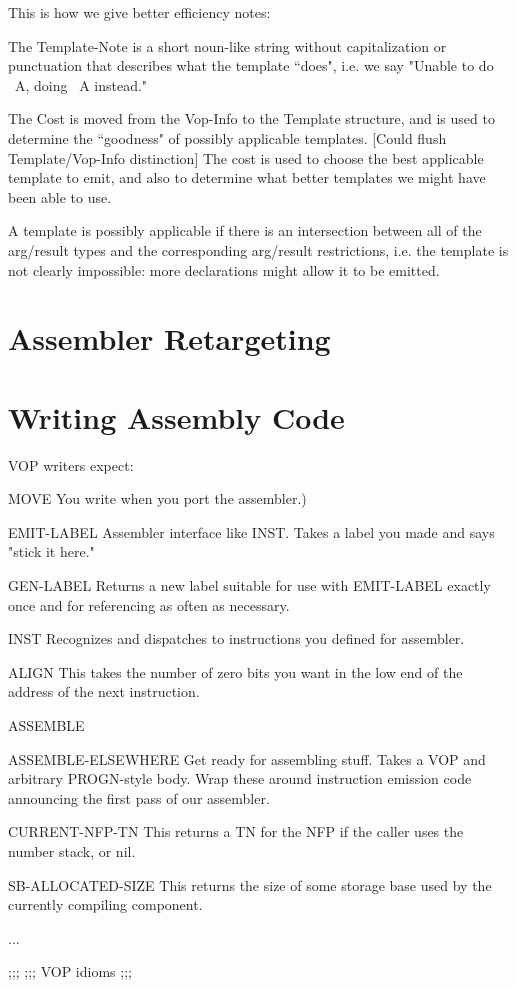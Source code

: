 This is how we give better efficiency notes:

The Template-Note is a short noun-like string without capitalization or
punctuation that describes what the template ``does", i.e. we say
"Unable to do ~A, doing ~A instead."

The Cost is moved from the Vop-Info to the Template structure, and is used to
determine the ``goodness" of possibly applicable templates.  [Could flush
Template/Vop-Info distinction]  The cost is used to choose the best applicable
template to emit, and also to determine what better templates we might have
been able to use.

A template is possibly applicable if there is an intersection between all of
the arg/result types and the corresponding arg/result restrictions, i.e. the
template is not clearly impossible: more declarations might allow it to be
emitted.


\chapter{Assembler Retargeting}


\chapter{Writing Assembly Code}

VOP writers expect:
\begin{Lentry}
\item[MOVE]
      You write when you port the assembler.)
\item[EMIT-LABEL]
      Assembler interface like INST.  Takes a label you made and says "stick it
      here."
   \item[GEN-LABEL]
      Returns a new label suitable for use with EMIT-LABEL exactly once and
      for referencing as often as necessary.
   \item[INST]
      Recognizes and dispatches to instructions you defined for assembler.
   \item[ALIGN]
      This takes the number of zero bits you want in the low end of the address
      of the next instruction.
   \item[ASSEMBLE]
   \item[ASSEMBLE-ELSEWHERE]
      Get ready for assembling stuff.  Takes a VOP and arbitrary PROGN-style
      body.  Wrap these around instruction emission code announcing the first
      pass of our assembler.
   \item[CURRENT-NFP-TN]
      This returns a TN for the NFP if the caller uses the number stack, or
      nil.
   \item[SB-ALLOCATED-SIZE]
      This returns the size of some storage base used by the currently
      compiling component.
   \item[...]
\end{Lentry}
;;;
;;; VOP idioms
;;;

